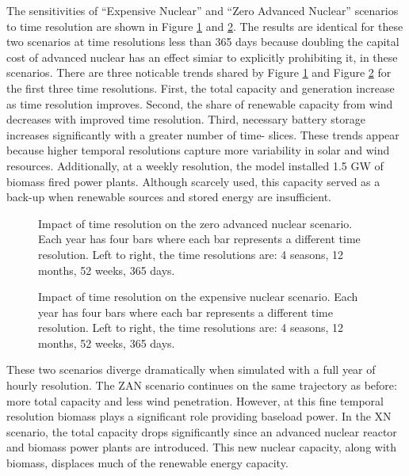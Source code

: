 The sensitivities of ``Expensive Nuclear'' and ``Zero Advanced Nuclear'' scenarios
to time resolution are shown in Figure \ref{fig:time_res_ZAN} and \ref{fig:time_res_XN}.
The results are identical for these two scenarios at time resolutions less than
365 days because doubling the capital cost of advanced nuclear has an effect simiar
to explicitly prohibiting it, in these scenarios.
There are three noticable trends shared by Figure \ref{fig:time_res_ZAN} and Figure
\ref{fig:time_res_XN} for the first three time resolutions.
 First, the total capacity and generation increase as time resolution improves.
Second, the share of renewable capacity from wind decreases with improved time resolution.
Third, necessary battery storage increases significantly with a greater number of time-
slices. These trends appear because higher temporal resolutions capture more
variability in solar and wind resources. Additionally, at a weekly resolution, the
model installed 1.5 GW of biomass fired power plants. Although scarcely used,
this capacity served as a back-up when renewable sources and stored energy are
insufficient.

\begin{figure}[H]
  \centering
  \resizebox{0.95\columnwidth}{!}{}
  \caption{Impact of time resolution on the zero advanced nuclear scenario.
  Each year has four bars where each bar represents a different time resolution.
  Left to right, the time resolutions are: 4 seasons, 12 months, 52 weeks, 365 days.}
  \label{fig:time_res_ZAN}
\end{figure}
\begin{figure}[H]
  \centering
  \resizebox{0.95\columnwidth}{!}{}
  \caption{Impact of time resolution on the expensive nuclear scenario.
  Each year has four bars where each bar represents a different time resolution.
  Left to right, the time resolutions are: 4 seasons, 12 months, 52 weeks, 365 days.}
  \label{fig:time_res_XN}
\end{figure}

These two scenarios diverge dramatically when simulated with a full year of hourly
resolution. The ZAN scenario continues on the same trajectory as before: more total capacity
and less wind penetration. However, at this fine temporal resolution biomass plays
a significant role providing baseload power. In the XN scenario, the total capacity
drops significantly since an advanced nuclear reactor and biomass power plants are
introduced. This new nuclear capacity, along with biomass, displaces much of the
renewable energy capacity.

